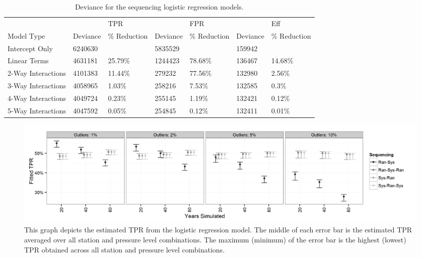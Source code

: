\documentclass[12pt]{article}
\begin{document}
\begin{table}[ht]
\centering
\begin{tabular}{l|ll|ll|ll}
  \hline
	& & TPR & & FPR & & Eff\\
	Model Type & Deviance & \% Reduction & Deviance & \% Reduction & Deviance & \% Reduction\\
  \hline
	Intercept Only & 6240630 &  & 5835529 &  & 159942 & \\
	Linear Terms  & 4631181 & 25.79\% & 1244423 & 78.68\% & 136467 & 14.68\%\\
	2-Way Interactions  & 4101383 & 11.44\% & 279232 & 77.56\% & 132980 & 2.56\%\\
	3-Way Interactions  & 4058965 & 1.03\% & 258216 & 7.53\% & 132585 & 0.3\%\\
	4-Way Interactions  & 4049724 & 0.23\% & 255145 & 1.19\% & 132421 & 0.12\%\\
	5-Way Interactions  & 4047592 & 0.05\% & 254845 & 0.12\% & 132411 & 0.01\%\\
   \hline
\end{tabular}
\caption{Deviance for the sequencing logistic regression models.}
\label{tab:devSeq}
\end{table}

\begin{figure}[h!]
	\centering
	\includegraphics[width=\textwidth]{TPR_Order_Plot_BW}
	\caption{This graph depicts the estimated TPR from the logistic regression model.  The middle of each error bar is the estimated TPR averaged over all station and pressure level combinations.  The maximum (minimum) of the error bar is the highest (lowest) TPR obtained across all station and pressure level combinations.}
	\label{fig:fitTPR}
\end{figure}
\end{document}
